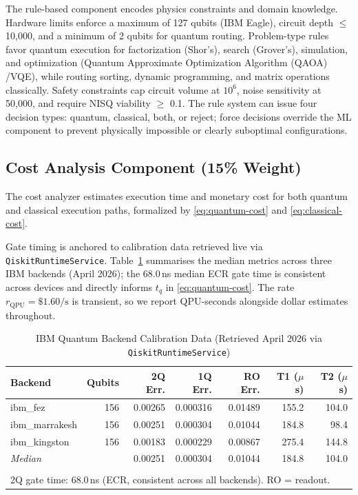 \documentclass[10pt,conference]{IEEEtran}
\begin{document}
The rule-based component encodes physics constraints and domain knowledge. Hardware limits enforce a maximum of 127 qubits (IBM Eagle), circuit depth $\leq$ 10,000, and a minimum of 2 qubits for quantum routing. Problem-type rules favor quantum execution for factorization (Shor's), search (Grover's), simulation, and optimization (Quantum Approximate Optimization Algorithm (QAOA) \cite{farhi2014}/VQE), while routing sorting, dynamic programming, and matrix operations classically. Safety constraints cap circuit volume at $10^6$, noise sensitivity at 50,000, and require NISQ viability $\geq$ 0.1. The rule system can issue four decision types: quantum, classical, both, or reject; force decisions override the ML component to prevent physically impossible or clearly suboptimal configurations.

\subsection{Cost Analysis Component (15\% Weight)}

The cost analyzer estimates execution time and monetary cost for both quantum and classical execution paths, formalized by \eqref{eq:quantum-cost} and \eqref{eq:classical-cost}.

Gate timing is anchored to calibration data retrieved live via \texttt{QiskitRuntimeService}. Table~\ref{tab:ibm-calibration} summarises the median metrics across three IBM backends (April 2026); the 68.0\,ns median ECR gate time is consistent across devices and directly informs $t_q$ in \eqref{eq:quantum-cost}. The rate $r_{\text{QPU}} = \$1.60/\text{s}$ \cite{ibm_pricing2024} is transient, so we report QPU-seconds alongside dollar estimates throughout.

\begin{table}[htbp]
\caption{IBM Quantum Backend Calibration Data (Retrieved April 2026 via \texttt{QiskitRuntimeService})}
\label{tab:ibm-calibration}
\centering
\footnotesize
\setlength{\tabcolsep}{3pt}
\begin{tabular}{l r r r r r r}
\toprule
\textbf{Backend} & \textbf{Qubits} & \textbf{2Q Err.} & \textbf{1Q Err.} & \textbf{RO Err.} & \textbf{T1 ($\mu$s)} & \textbf{T2 ($\mu$s)} \\
\midrule
ibm\_fez       & 156 & 0.00265 & 0.000316 & 0.01489 & 155.2 & 104.0 \\
ibm\_marrakesh & 156 & 0.00251 & 0.000304 & 0.01044 & 184.8 &  98.4 \\
ibm\_kingston  & 156 & 0.00183 & 0.000229 & 0.00867 & 275.4 & 144.8 \\
\midrule
\textit{Median} &     & 0.00251 & 0.000304 & 0.01044 & 184.8 &  104.0 \\
\bottomrule
\\[-0.5em]
\multicolumn{7}{l}{\footnotesize 2Q gate time: 68.0\,ns (ECR, consistent across all backends). RO = readout.}
\end{tabular}
\end{table}
\end{document}
